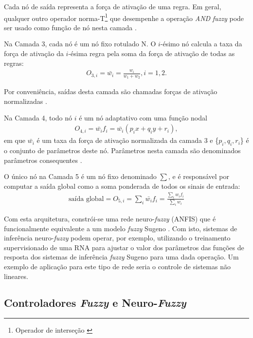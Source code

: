Cada nó de saída representa a força de ativação de uma regra. Em geral, qualquer outro operador norma-T\footnote{Operador de interseção \cite[p.~337]{Jang1997}} que desempenhe a operação \textit{AND} \textit{fuzzy} pode ser usado como função de nó nesta camada \cite[p.~337]{Jang1997}.

Na Camada 3, cada nó é um nó fixo rotulado N. O $i$-ésimo nó calcula a taxa da força de ativação da $i$-ésima regra pela soma da força de ativação de todas as regras:
\begin{align*}
    O_{3,i} = \bar{w_i} = \frac{w_i}{w_1 + w_2}, i = 1, 2.
\end{align*}

Por conveniência, saídas desta camada são chamadas forças de ativação normalizadas \cite[p.~336]{Jang1997}.

Na Camada 4, todo nó $i$ é um nó adaptativo com uma função nodal
\begin{align*}
    O_{4,i} = \bar{w_i}f_i = \bar{w_i}(p_ix+q_iy+r_i),
\end{align*}
em que $\bar{w_i}$ é um taxa da força de ativação normalizada da camada 3 e \{$p_i, q_i, r_i$\} é o conjunto de parâmetros deste nó. Parâmetros nesta camada são denominados parâmetros consequentes \cite[p.~336]{Jang1997}.

O único nó na Camada 5 é um nó fixo denominado $\sum$, e é responsável por computar a saída global como a soma ponderada de todos os sinais de entrada:
\begin{align*}
    \mbox{saída global} = O_{5,i} = \sum_{i} {\bar{w_i}f_i} = \frac{\sum_{i} {w_if_i}}{\sum_{i} {w_i}} %
\end{align*}

Com esta arquitetura, constrói-se uma rede neuro-\textit{fuzzy} (ANFIS) que é funcionalmente equivalente a um modelo \textit{fuzzy} Sugeno \cite{Jang1997}. Com isto, sistemas de inferência neuro-\textit{fuzzy} podem operar, por exemplo, utilizando o treinamento supervisionado de uma RNA para ajustar o valor dos parâmetros das funções de resposta dos sistemas de inferência \textit{fuzzy} Sugeno para uma dada operação. Um exemplo de aplicação para este tipo de rede seria o controle de sistemas não lineares.

\subsection{Controladores \textit{Fuzzy} e Neuro-\textit{Fuzzy}}

